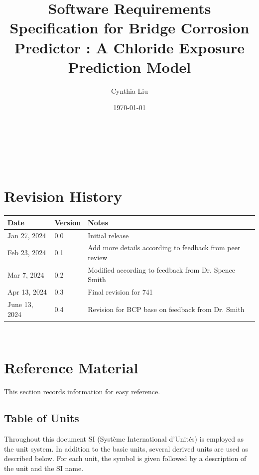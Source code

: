 \documentclass[12pt]{article}
\begin{document}
\title{Software Requirements Specification for Bridge Corrosion Predictor : A Chloride Exposure Prediction Model} 
\author{Cynthia Liu}
\date{\today}
	
\maketitle

~\newpage


\tableofcontents

~\newpage

\section*{Revision History}

\begin{tabularx}{\textwidth}{p{3cm}p{2cm}X}
\toprule {\bf Date} & {\bf Version} & {\bf Notes}\\
\midrule
Jan 27, 2024 & 0.0 & Initial release\\
Feb 23, 2024 & 0.1 & Add more details according to feedback from peer review\\
Mar 7, 2024 & 0.2 & Modified according to feedback from Dr. Spence Smith\\
Apr 13, 2024 & 0.3 & Final revision for 741\\
June 13, 2024 & 0.4 & Revision for BCP base on feedback from Dr. Smith\\
\bottomrule
\end{tabularx}

~\newpage

\section{Reference Material}

This section records information for easy reference.

\subsection{Table of Units}

Throughout this document SI (Syst\`{e}me International d'Unit\'{e}s) is employed
as the unit system.  In addition to the basic units, several derived units are
used as described below.  For each unit, the symbol is given followed by a
description of the unit and the SI name.
~\newline
\end{document}
